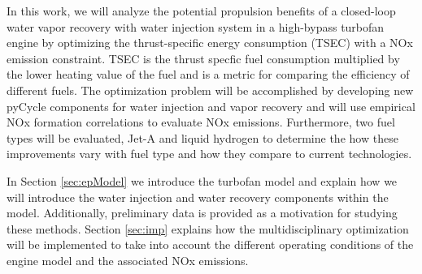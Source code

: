 \documentclass[conf]{new-aiaa}
\begin{document}
In this work, we will analyze the potential propulsion benefits of a closed-loop water vapor recovery with water injection system in a high-bypass turbofan engine by optimizing the thrust-specific energy consumption (TSEC) with a NOx emission constraint.
TSEC is the thrust specfic fuel consumption multiplied by the lower heating value of the fuel and is a metric for comparing the efficiency of different fuels.
The optimization problem will be accomplished by developing new pyCycle components for water injection and vapor recovery and will use empirical NOx formation correlations to evaluate NOx emissions.
Furthermore, two fuel types will be evaluated, Jet-A and liquid hydrogen to determine the how these improvements vary with fuel type and how they compare to current technologies.

In Section \ref{sec:epModel} we introduce the turbofan model and explain how we will introduce the water injection and water recovery components within the model.
Additionally, preliminary data is provided as a motivation for studying these methods.
Section \ref{sec:imp} explains how the multidisciplinary optimization will be implemented to take into account the different operating conditions of the engine model and the associated NOx emissions.
\end{document}
